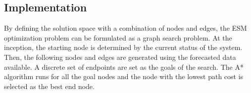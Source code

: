 





\subsection{Implementation}
By defining the solution space with a combination of nodes and edges, the ESM optimization problem can be formulated as a graph search problem. At the inception, the starting node is determined by the current status of the system. Then, the following nodes and edges are generated using the forecasted data available. A discrete set of endpoints are set as the goals of the search. The A*  algorithm runs for all the goal nodes and the node with the lowest path cost is selected as the best end node.

